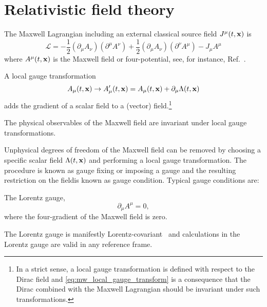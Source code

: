 \section{Relativistic field theory}

\begin{definition}
	The Maxwell Lagrangian including an external classical source field $J^\mu(t,\vb{x})$ is
	\begin{equation}
		\mathcal{L}
		=
		-
		\frac{1}{2}
		(\partial_\mu A_\nu)
		(\partial^\mu A^\nu)
		+
		\frac{1}{2}
		(\partial_\mu A_\nu)
		(\partial^\nu A^\mu)
		-
		J_\mu A^\mu
		\label{eq:mw_lagrangian}
	\end{equation}
	where $A^\mu(t,\vb{x})$ is the Maxwell field or four-potential, see, for instance, Ref.~\cite[p.~339]{Srednicki2007}.
\end{definition}
\begin{definition}
	A local gauge transformation
	\begin{equation}
		A_\mu(t,\vb{x})
		\to
		A_\mu^\prime(t,\vb{x})
		=
		A_\mu(t,\vb{x})
		+
		\partial_\mu\Lambda(t,\vb{x})
		\label{eq:mw_local_gauge_transform}
	\end{equation}
	adds the gradient of a scalar field to a (vector) field.\footnote{In a strict sense, a local gauge transformation is defined with respect to the Dirac field and \cref{eq:mw_local_gauge_transform} is a consequence that the Dirac combined with the Maxwell Lagrangian should be invariant under such transformations.}
\end{definition}
\begin{theorem}\label{thm:mw_local_gauge_invariance}
	The physical observables of the Maxwell field are invariant under local gauge transformations.
\end{theorem}
Unphysical degrees of freedom of the Maxwell field can be removed by choosing a specific scalar field $\Lambda(t,\vb{x})$ and performing a local gauge transformation.
The procedure is known as gauge fixing or imposing a gauge and the resulting restriction on the fieldis known as gauge condition.
Typical gauge conditions are:
\begin{definition}
	The Lorentz gauge,
	\begin{equation}
		\partial_\mu
		A^\mu
		=
		0
		,
	\end{equation}
	where the four-gradient of the Maxwell field is zero.
\end{definition}
The Lorentz gauge is manifestly Lorentz-covariant~\cite[p.~144]{Greiner2013} and calculations in the Lorentz gauge are valid in any reference frame.
